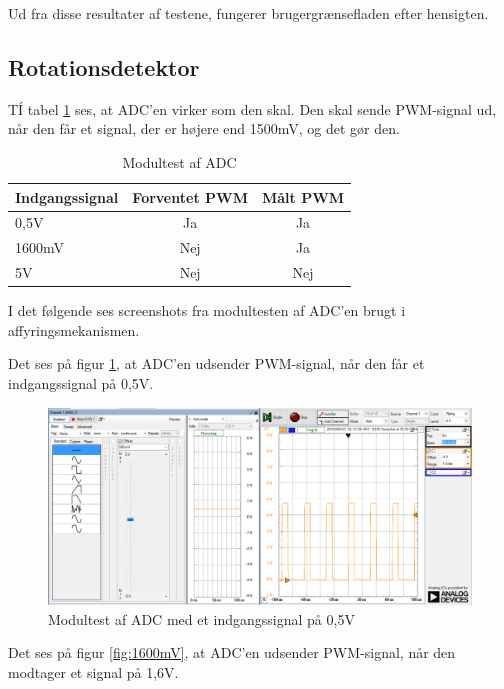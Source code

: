Ud fra disse resultater af testene, fungerer brugergrænsefladen efter hensigten.

\subsection{Rotationsdetektor}
TÍ tabel \ref{table:ADC_affyring_test} ses, at ADC'en virker som den skal. Den skal sende PWM-signal ud, når den får et signal, der er højere end 1500mV, og det gør den. 

\begin{table}[H]
	\centering
	\begin{tabular}{|l|c|c|}
		\hline
		\textbf{Indgangssignal} & \textbf{Forventet PWM}	& \textbf{Målt PWM} \\ \hline
		0,5V					& Ja                     	& Ja                \\ \hline
		1600mV					& Nej                    	& Ja                \\ \hline
		5V 						& Nej						& Nej                \\ \hline
	\end{tabular}
	\caption{Modultest af ADC}
	\label{table:ADC_affyring_test}
\end{table}

\noindent I det følgende ses screenshots fra modultesten af ADC'en brugt i affyringsmekanismen. \newline

\noindent Det ses på figur \ref{fig:500mV}, at ADC'en udsender PWM-signal, når den får et indgangssignal på 0,5V. 

\begin{figure}[H]
	\centering
	\includegraphics[width=\textwidth]{Test/images/AffyringTest/ADC/0,5V}
	\caption{Modultest af ADC med et indgangssignal på 0,5V}
	\label{fig:500mV}
\end{figure}

\noindent Det ses på figur \ref{fig:1600mV}, at ADC'en udsender PWM-signal, når den modtager et signal på 1,6V. 

